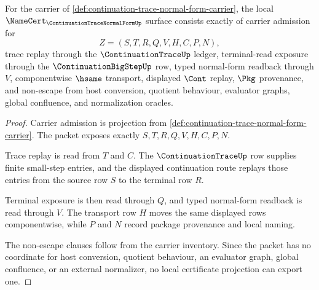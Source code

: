 \begin{theorem}
\label{thm:continuation-trace-normal-form-namecert-obligations}
For the carrier of \autoref{def:continuation-trace-normal-form-carrier}, the local $\NameCert_{\ContinuationTraceNormalFormUp}$ surface consists exactly of carrier admission for
$$
Z=(S,T,R,Q,V,H,C,P,N),
$$
trace replay through the $\ContinuationTraceUp$ ledger, terminal-read exposure through the $\ContinuationBigStepUp$ row, typed normal-form readback through $V$, componentwise $\hsame$ transport, displayed $\Cont$ replay, $\Pkg$ provenance, and non-escape from host conversion, quotient behaviour, evaluator graphs, global confluence, and normalization oracles.
\end{theorem}
\begin{proof}
Carrier admission is projection from \autoref{def:continuation-trace-normal-form-carrier}. The packet exposes exactly $S,T,R,Q,V,H,C,P,N$.

Trace replay is read from $T$ and $C$. The $\ContinuationTraceUp$ row supplies finite small-step entries, and the displayed continuation route replays those entries from the source row $S$ to the terminal row $R$.

Terminal exposure is then read through $Q$, and typed normal-form readback is read through $V$. The transport row $H$ moves the same displayed rows componentwise, while $P$ and $N$ record package provenance and local naming.

The non-escape clauses follow from the carrier inventory. Since the packet has no coordinate for host conversion, quotient behaviour, an evaluator graph, global confluence, or an external normalizer, no local certificate projection can export one.
\end{proof}

